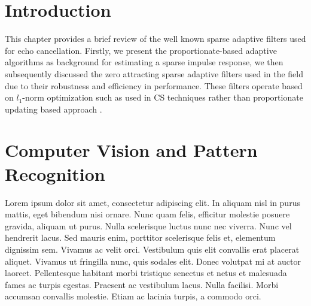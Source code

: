 
\section{Introduction}\label{sec:3.1}
\vspace{-0.5cm}
\noindent This chapter provides a brief review of the well known sparse adaptive filters used for echo cancellation. Firstly, we present the proportionate-based adaptive algorithms as background for estimating a sparse impulse response, we then subsequently discussed the zero attracting sparse adaptive filters used in the field due to their robustness and efficiency in performance. These filters operate based on $l_1$-norm optimization such as used in CS techniques \cite{Dohono} rather than proportionate updating based approach \cite{Duttweiler}.

\vspace{-0.3cm}




\section{Computer Vision and Pattern Recognition}\label{sec:3.2}
\vspace{-0.5cm}
\noindent Lorem ipsum dolor sit amet, consectetur adipiscing elit. In aliquam nisl in purus mattis, eget bibendum nisi ornare. Nunc quam felis, efficitur molestie posuere gravida, aliquam ut purus. Nulla scelerisque luctus nunc nec viverra. Nunc vel hendrerit lacus. Sed mauris enim, porttitor scelerisque felis et, elementum dignissim sem. Vivamus ac velit orci. Vestibulum quis elit convallis erat placerat aliquet. Vivamus ut fringilla nunc, quis sodales elit. Donec volutpat mi at auctor laoreet. Pellentesque habitant morbi tristique senectus et netus et malesuada fames ac turpis egestas. Praesent ac vestibulum lacus. Nulla facilisi. Morbi accumsan convallis molestie. Etiam ac lacinia turpis, a commodo orci.

\vspace{-0.3cm}




